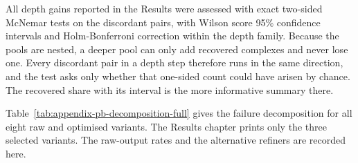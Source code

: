 All depth gains reported in the Results were assessed with exact two-sided McNemar tests on the discordant pairs, with Wilson score 95\% confidence intervals and Holm-Bonferroni correction within the depth family. Because the pools are nested, a deeper pool can only add recovered complexes and never lose one. Every discordant pair in a depth step therefore runs in the same direction, and the test asks only whether that one-sided count could have arisen by chance. The recovered share with its interval is the more informative summary there.

Table~\ref{tab:appendix-pb-decomposition-full} gives the failure decomposition for all eight raw and optimised variants. The Results chapter prints only the three selected variants. The raw-output rates and the alternative refiners are recorded here.

